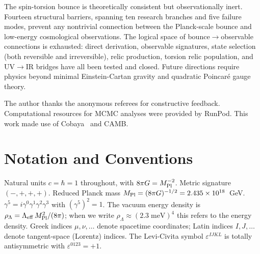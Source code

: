 \documentclass[aps,prd,twocolumn,superscriptaddress,showpacs,preprintnumbers,
  nofootinbib,longbibliography,floatfix]{revtex4-2}
\newcommand{\Leff}{\Lambda_{\rm eff}}
\newcommand{\MPl}{M_{\rm Pl}}
\begin{document}
The spin-torsion bounce is theoretically consistent but observationally
inert. Fourteen structural barriers, spanning ten research branches and
five failure modes, prevent any nontrivial connection between the
Planck-scale bounce and low-energy cosmological observations. The logical
space of bounce$\to$observable connections is exhausted: direct derivation,
observable signatures, state selection (both reversible and irreversible),
relic production, torsion relic population, and UV$\to$IR bridges have all
been tested and closed. Future directions require physics beyond minimal
Einstein-Cartan gravity and quadratic Poincar\'e gauge theory.


\begin{acknowledgments}
The author thanks the anonymous referees for constructive feedback.
Computational resources for MCMC analyses were provided by RunPod.
This work made use of Cobaya~\cite{Cobaya2021} and CAMB.
\end{acknowledgments}


\appendix

\section{Notation and Conventions}\label{app:notation}

Natural units $c=\hbar=1$ throughout, with $8\pi G = \MPl^{-2}$.
Metric signature $(-,+,+,+)$. Reduced Planck mass
$\MPl = (8\pi G)^{-1/2} = 2.435 \times 10^{18}$~GeV.
$\gamma^5 = i\gamma^0\gamma^1\gamma^2\gamma^3$ with
$(\gamma^5)^2 = 1$. The vacuum energy density is
$\rho_\Lambda = \Leff\,\MPl^2/(8\pi)$; when we write
$\rho_\Lambda \approx (2.3\;\text{meV})^4$ this refers to the energy
density. Greek indices $\mu,\nu,\ldots$ denote spacetime coordinates;
Latin indices $I,J,\ldots$ denote tangent-space (Lorentz) indices.
The Levi-Civita symbol $\varepsilon^{IJKL}$ is totally antisymmetric
with $\varepsilon^{0123}=+1$.
\end{document}
